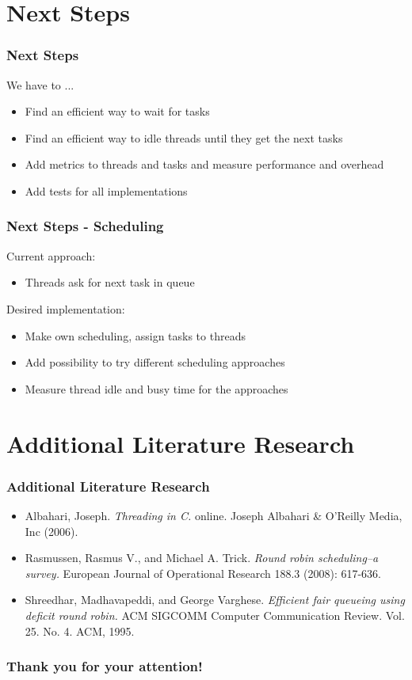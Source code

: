 \documentclass{beamer}
\begin{document}
\section{Next Steps}
\begin{frame}
	\frametitle{Next Steps}
	We have to ...
	\begin{itemize}
		\item Find an efficient way to wait for tasks
		\item Find an efficient way to idle threads until they get the next tasks
		\item Add metrics to threads and tasks and measure performance and overhead
		\item Add tests for all implementations
	\end{itemize}
\end{frame}

\begin{frame}
	\frametitle{Next Steps - Scheduling}
	Current approach:  
	\begin{itemize}
		\item Threads ask for next task in queue
	\end{itemize}
	Desired implementation: 
	\begin{itemize}
		\item Make own scheduling, assign tasks to threads
		\item Add possibility to try different scheduling approaches
		\item Measure thread idle and busy time for the approaches
	\end{itemize}
\end{frame}

\section{Additional Literature Research}
    \begin{frame}
        \frametitle{Additional Literature Research}
        \begin{itemize}
            \item Albahari, Joseph. \emph{Threading in C.} online. Joseph Albahari \& O’Reilly Media, Inc (2006).
            \item Rasmussen, Rasmus V., and Michael A. Trick. \emph{Round robin scheduling–a survey.} European Journal of Operational Research 188.3 (2008): 617-636.
            \item Shreedhar, Madhavapeddi, and George Varghese. \emph{Efficient fair queueing using deficit round robin.} ACM SIGCOMM Computer Communication Review. Vol. 25. No. 4. ACM, 1995.
        \end{itemize}
    \end{frame}



    \begin{frame}
        \frametitle{Thank you for your attention!}
    \end{frame}
\end{document}
